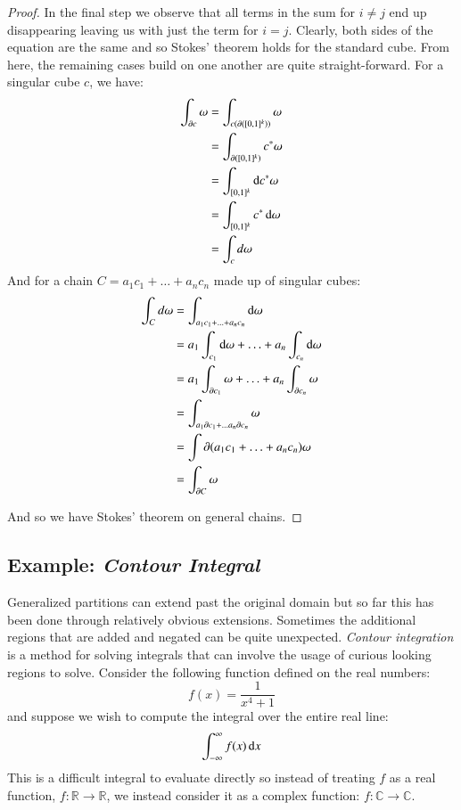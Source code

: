 \begin{proof}
In the final step we observe that all terms in the sum for $i \neq j$ end up disappearing leaving us with just the term for
$i=j$.
Clearly, both sides of the equation are the same and so Stokes' theorem holds for the standard cube.
From here, the remaining cases build on one another are quite straight-forward.
For a singular cube $c$, we have:
\begin{align*}
	\int_{\partial c} \omega
		&= \int_{c (\partial ([0,1]^k))} \omega \\
		&= \int_{\partial( [0,1]^k)} c^* \omega \\
		&= \int_{[0,1]^k} \mathop{}\!\mathrm{d} c^* \omega \\
		&= \int_{[0,1]^k} c^* \mathop{}\!\mathrm{d} \omega \\
		&= \int_c d\omega
\end{align*}
And for a chain $C=a_1 c_1 + \ldots + a_n c_n$ made up of singular cubes:
\begin{align*}
	\int_C d\omega 
		&= \int_{a_1c_1 + \ldots + a_nc_n	} \mathop{}\!\mathrm{d}\omega \\
		&= a_1 \int_{c_1} \mathop{}\!\mathrm{d}\omega + \ldots + a_n \int_{c_n} \mathop{}\!\mathrm{d}\omega \\
		&= a_1 \int_{\partial c_1} \omega + \ldots + a_n \int_{\partial c_n} \omega \\
		&= \int_{a_1 \partial c_1 + \ldots a_n \partial c_n} \omega \\
		&= \int{\partial ( a_1c_1 + \ldots + a_n c_n)} \omega \\
		&= \int_{\partial C} \omega
\end{align*}

And so we have Stokes' theorem on general chains.
\end{proof}


\subsection{Example: \emph{Contour Integral}}


Generalized partitions can extend past the original domain but so far this has been done through relatively
obvious extensions.
Sometimes the additional regions that are added and negated can be quite unexpected.
\emph{Contour integration} is a method for solving integrals that can involve the usage of curious looking regions to solve.
Consider the following function defined on the real numbers:
\begin{equation*}
	f(x) = \frac{1}{x^4 + 1}
\end{equation*}
and suppose we wish to compute the integral over the entire real line:
\begin{equation*}
	 \int_{-\infty}^\infty f(x) \mathop{}\!\mathrm{d} x
\end{equation*}
This is a difficult integral to evaluate directly so instead of treating $f$ as a real function, $f:\mathbb{R} \to \mathbb{R}$, 
we instead consider it as a complex function: $f:\mathbb{C} \to \mathbb{C}$.



